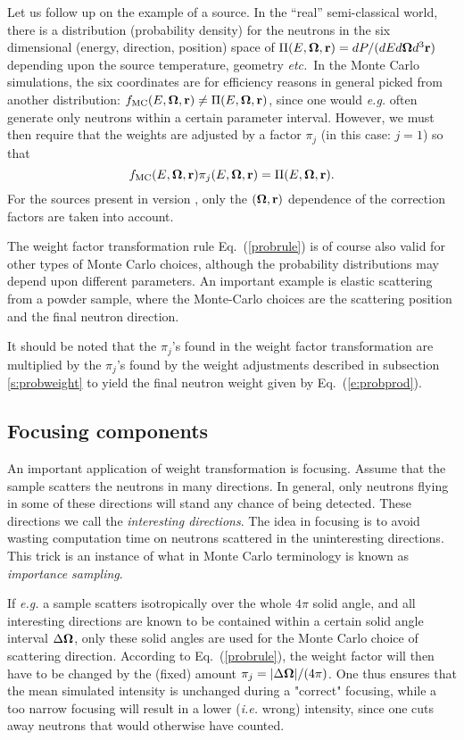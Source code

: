 Let us follow up on the example of a source.
In the ``real'' semi-classical world, there is a distribution
(probability density) for the neutrons in the six dimensional
(energy, direction, position) space of
$\Pi(E,\mbox{\boldmath $\Omega$},{\bf r}) = dP/(dE d\mbox{\boldmath $\Omega$} d^3{\bf r})$ depending upon
the source temperature, geometry {\em etc.}\ In the
Monte Carlo simulations, the six coordinates are for efficiency reasons
in general picked from another distribution:
$f_{\rm MC}(E,\mbox{\boldmath $\Omega$},{\bf r}) \neq \Pi(E, \mbox{\boldmath $\Omega$},{\bf r})$,
since one would {\em e.g.} often generate
only neutrons within a certain parameter interval.
However, we must then require that the weights are adjusted
by a factor $\pi_j$ (in this case: $j=1$) so that
\begin{equation} \label{probrule}
f_{\rm MC}(E,\mbox{\boldmath $\Omega$},{\bf r}) \pi_j(E,\mbox{\boldmath $\Omega$},{\bf r})
 = \Pi(E,\mbox{\boldmath $\Omega$},{\bf r}) .
\end{equation}
For the sources present in version \version,
only the $(\mbox{\boldmath $\Omega$}, {\bf r})$ dependence of the correction factors
are taken into account.

The weight factor transformation rule Eq.~(\ref{probrule})
is of course also valid for other types of Monte Carlo choices,
although the probability distributions may depend upon
different parameters. An important example
is elastic scattering from a powder sample,
where the Monte-Carlo choices are the scattering position
and the final neutron direction.

It should be noted that the $\pi_j$'s found in the weight factor
transformation are multiplied by the $\pi_j$'s found by the
weight adjustments described in
subsection \ref{s:probweight} to yield the final neutron
weight given by Eq.~(\ref{e:probprod}).

\subsection{Focusing components}
\label{s:focus}
An important application of weight transformation is focusing.
Assume that the sample scatters the neutrons in many directions.
In general, only neutrons flying in some of these directions will
stand any chance of being detected. These directions we call
the {\em interesting directions}.
The idea in focusing is to avoid wasting computation time on
neutrons scattered in the uninteresting directions.
This trick is an instance of what in Monte Carlo terminology
is known as {\em importance sampling}. %

If {\em e.g.} a sample scatters isotropically
over the whole $4\pi$ solid angle, and all interesting
directions are known to be contained within a certain
solid angle interval $\Delta \mbox{\boldmath $\Omega$}$, only these solid angles
are used for the Monte Carlo choice of scattering direction.
According to Eq.~(\ref{probrule}), the weight factor will then have
to be changed by the (fixed) amount
$\pi_j = |\Delta \mbox{\boldmath $\Omega$}| / (4 \pi)$.
One thus ensures that the mean simulated intensity is unchanged
during a "correct" focusing, while a too narrow focusing will
result in a lower (\textit{i.e.} wrong) intensity, since one cuts
away neutrons that would otherwise have counted.


